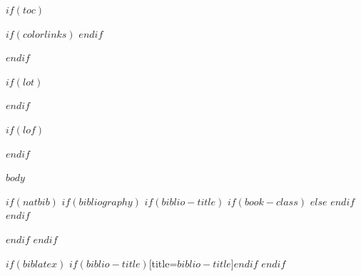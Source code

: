 \documentclass[10pt, a4paper, titlepage, oneside, openright, final, article]{memoir}
\begin{document}
%
%
$if(toc)$
{
    $if(colorlinks)$
        \hypersetup{linkcolor=$if(toccolor)$$toccolor$$else$$endif$}
    $endif$
    \cleardoublepage
    \begin{KeepFromToc} %
        \tableofcontents
    \end{KeepFromToc}
    \pagebreak
    \cleardoublepage
}
$endif$

$if(lot)$
    \listoftables
$endif$

$if(lof)$
    \listoffigures
$endif$


\mainmatter
$body$

\appendix

\backmatter

$if(natbib)$
    $if(bibliography)$
        $if(biblio-title)$
            $if(book-class)$
                \renewcommand\bibname{$biblio-title$}
            $else$
                \renewcommand\refname{$biblio-title$}
            $endif$
        $endif$
        
    $endif$
$endif$

$if(biblatex)$
    \printbibliography$if(biblio-title)$[title=$biblio-title$]$endif$
$endif$


\end{document}
